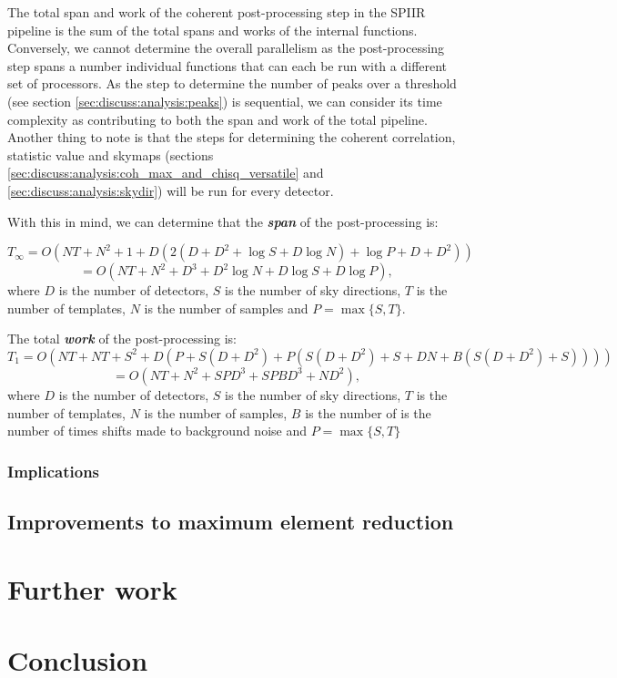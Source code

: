 \documentclass{article}
\begin{document}
The total span and work of the coherent post-processing step in the SPIIR pipeline is the sum of the total spans and works of the internal functions.
Conversely, we cannot determine the overall parallelism as the post-processing step spans a number individual functions that can each be run with a different set of processors.
As the step to determine the number of peaks over a threshold (see section \ref{sec:discuss:analysis:peaks}) is sequential, we can consider its time complexity as contributing to both the span and work of the total pipeline.
Another thing to note is that the steps for determining the coherent correlation, statistic value and skymaps (sections \ref{sec:discuss:analysis:coh_max_and_chisq_versatile} and \ref{sec:discuss:analysis:skydir}) will be run for every detector.

With this in mind, we can determine that the \textit{\textbf{span}} of the post-processing is:

\[
    T_\infty = O(NT + N^2 + 1 + D(2(D + D^2 + \log S + D \log N) + \log P + D + D^2))
\]
\begin{equation} \label{eq:total_span}
    = O(NT + N^2 + D^3 + D^2 \log N + D \log S + D \log P),
\end{equation}
where \(D\) is the number of detectors, \(S\) is the number of sky directions, \(T\) is the number of templates, \(N\) is the number of samples and \(P = \max\{ S, T \}\).

The total \textit{\textbf{work}} of the post-processing is:
\[
    T_1 = O(NT + NT + S^2 + D(P + S(D + D^2) + P(S(D + D^2) + S + DN + B(S(D + D^2) + S))))
\]
\begin{equation} \label{eq:total_work}
    = O(NT + N^2 + SPD^3 + SPBD^3 + ND^2),
\end{equation}
where \(D\) is the number of detectors, \(S\) is the number of sky directions, \(T\) is the number of templates, \(N\) is the number of samples, \(B\) is the number of is the number of times shifts made to background noise and \(P = \max\{ S, T \}\)

\subsubsection{Implications} \label{sec:discuss:analysis:implications}


\subsection{Improvements to maximum element reduction}

\section{Further work} \label{sec:further_work}

\section{Conclusion} \label{sec:conclusion}

\printbibliography[heading=bibintoc]{}
\end{document}
